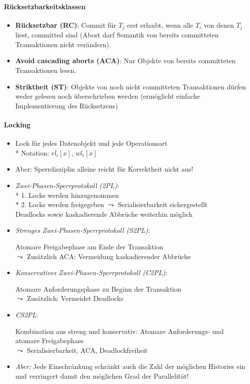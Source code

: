 \paragraph{Rücksetzbarkeitsklassen}
\begin{itemize}
	\item \textbf{Rücksetzbar (RC)}: Commit für $T_j$ erst erlaubt, wenn alle $T_i$ von denen $T_j$ liest, committed sind (Abort darf Semantik von bereits committeten Transaktionen nicht verändern).
	\item \textbf{Avoid cascading aborts (ACA)}: Nur Objekte von bereits committeten Transaktionen lesen.
	\item \textbf{Striktheit (ST)}: Objekte von noch nicht committeten Transaktionen dürfen weder gelesen noch überschrieben werden (ermöglicht einfache Implementierung des Rücksetzens)
\end{itemize}

\paragraph{Locking}
\begin{itemize}
	\item Lock für jedes Datenobjekt und jede Operationsart
		\\*
		Notation: \( rl_i[x] \), \( wl_i[x] \)
	\item Aber: Sperrdisziplin alleine reicht für Korrektheit nicht aus!
	
	\item \emph{Zwei-Phasen-Sperrprotokoll (2PL)}: \\*
		1. Locks werden hinzugenommen \\*
		2. Locks werden freigegeben
	\( \leadsto \) Serialisierbarkeit sichergestellt\\
						Deadlocks sowie kaskadierende Abbrüche weiterhin möglich
	
	\item \emph{Strenges Zwei-Phasen-Sperrprotokoll (S2PL)}: 
	
	Atomare Freigabephase am Ende der Transaktion\\
	\( \leadsto \) Zusätzlich ACA: Vermeidung kaskadierender Abbrüche
	
	\item \emph{Konservatives Zwei-Phasen-Sperrprotokoll (C2PL)}:
	
	Atomare Anforderungsphase zu Beginn der Transaktion\\
	\( \leadsto \) Zusätzlich: Vermeidet Deadlocks
	
	\item \emph{CS2PL}: 
	
	Kombination aus streng und konservativ: Atomare Anforderungs- und atomare Freigabephase \\
	\( \leadsto \) Serialisierbarkeit, ACA, Deadlockfreiheit
	
	\item \emph{Aber:} Jede Einschränkung schränkt auch die Zahl der möglichen Histories ein und verringert damit den möglichen Grad der Parallelität!
	
\end{itemize}

